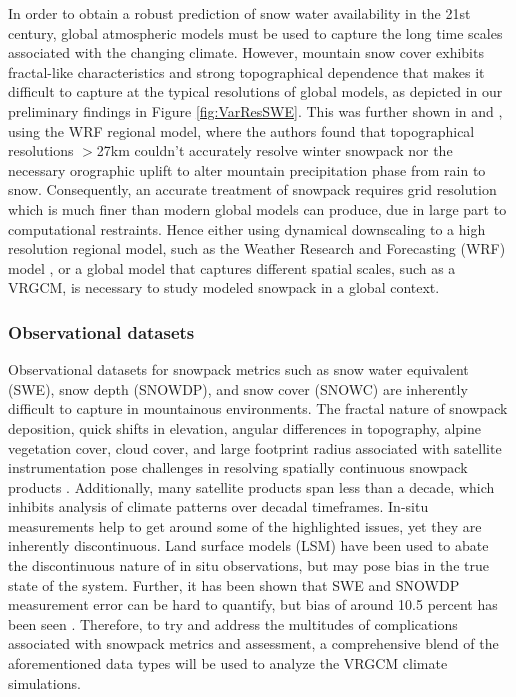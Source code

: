 \documentclass[11pt]{article}
\begin{document}
In order to obtain a robust prediction of snow water availability in the 21st century, global atmospheric models must be used to capture the long time scales associated with the changing climate.  However, mountain snow cover exhibits fractal-like characteristics and strong topographical dependence that makes it difficult to capture at the typical resolutions of global models, as depicted in our preliminary findings in Figure \ref{fig:VarResSWE}.  This was further shown in \cite{pavelsky2011accumulation} and \cite{pavelsky2012changes}, using the WRF regional model, where the authors found that topographical resolutions $>$27km couldn't accurately resolve winter snowpack nor the necessary orographic uplift to alter mountain precipitation phase from rain to snow. Consequently, an accurate treatment of snowpack requires grid resolution which is much finer than modern global models can produce, due in large part to computational restraints. Hence either using dynamical downscaling to a high resolution regional model, such as the Weather Research and Forecasting (WRF) model \citep{michalakes2001development}, or a global model that captures different spatial scales, such as a VRGCM, is necessary to study modeled snowpack in a global context.

\subsubsection{Observational datasets} \label{sec:ObservationalData}

Observational datasets for snowpack metrics such as snow water equivalent (SWE), snow depth (SNOWDP), and snow cover (SNOWC) are inherently difficult to capture in mountainous environments.  The fractal nature of snowpack deposition, quick shifts in elevation, angular differences in topography, alpine vegetation cover, cloud cover, and large footprint radius associated with satellite instrumentation pose challenges in resolving spatially continuous snowpack products \citep{brownandmote2009, rutter2009SnowMIP2}.  Additionally, many satellite products span less than a decade, which inhibits analysis of climate patterns over decadal timeframes.  In-situ measurements help to get around some of the highlighted issues, yet they are inherently discontinuous.  Land surface models (LSM) have been used to abate the discontinuous nature of in situ observations, but may pose bias in the true state of the system.  Further, it has been shown that SWE and SNOWDP measurement error can be hard to quantify, but bias of around 10.5 percent has been seen \citep{ rutter2009SnowMIP2}.  Therefore, to try and address the multitudes of complications associated with snowpack metrics and assessment, a comprehensive blend of the aforementioned data types will be used to analyze the VRGCM climate simulations. 
\end{document}
